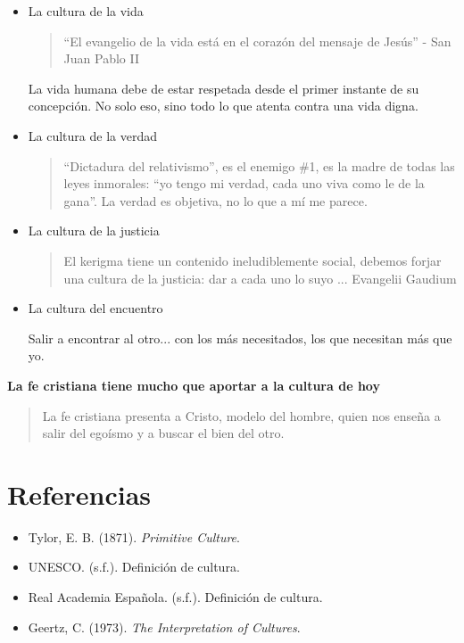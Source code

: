 \documentclass[a4paper,12pt,oneside]{article}
\begin{document}
\begin{itemize}
    \item La cultura de la vida

    \begin{quote}
    “El evangelio de la vida está en el corazón del mensaje de Jesús” - San Juan Pablo II
    \end{quote}

    La vida humana debe de estar respetada desde el primer instante de su concepción. No solo eso, sino todo lo que atenta contra una vida digna.

    \item La cultura de la verdad

    \begin{quote}
    “Dictadura del relativismo”, es el enemigo \#1, es la madre de todas las leyes inmorales: “yo tengo mi verdad, cada uno viva como le de la gana”. La verdad es objetiva, no lo que a mí me parece.
    \end{quote}

    \item La cultura de la justicia

    \begin{quote}
    El kerigma tiene un contenido ineludiblemente social, debemos forjar una cultura de la justicia: dar a cada uno lo suyo ... Evangelii Gaudium
    \end{quote}

    \item La cultura del encuentro

    Salir a encontrar al otro... con los más necesitados, los que necesitan más que yo.
\end{itemize}

\textbf{La fe cristiana tiene mucho que aportar a la cultura de hoy}

\begin{quote}
La fe cristiana presenta a Cristo, modelo del hombre, quien nos enseña a salir del egoísmo y a buscar el bien del otro.
\end{quote}

\section*{Referencias}
\begin{itemize}
    \item Tylor, E. B. (1871). \textit{Primitive Culture}.
    \item UNESCO. (s.f.). Definición de cultura.
    \item Real Academia Española. (s.f.). Definición de cultura.
    \item Geertz, C. (1973). \textit{The Interpretation of Cultures}.
\end{itemize}
\end{document}
